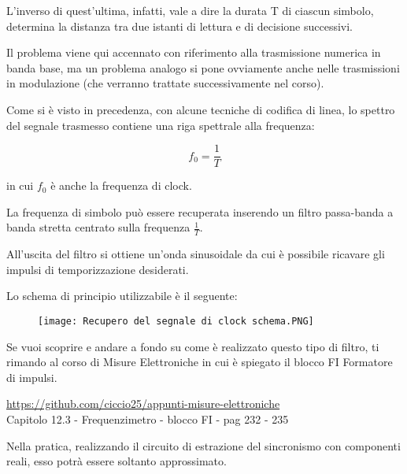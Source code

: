 L'inverso di quest'ultima, infatti, vale a dire la durata T di ciascun simbolo, 
determina la distanza tra due istanti di lettura e di decisione successivi. \newline 

Il problema viene qui accennato con riferimento alla trasmissione numerica in banda base, 
ma un problema analogo si pone ovviamente anche nelle trasmissioni in modulazione (che verranno trattate successivamente nel corso). \newline 

Come si è visto in precedenza, con alcune tecniche di codifica di linea, 
lo spettro del segnale trasmesso contiene una riga spettrale alla frequenza: 

{
    \Large
    \begin{equation}
        f_0 = \frac{1}{T}
    \end{equation}
}

in cui $f_0$ è anche la frequenza di clock. \newline 

La frequenza di simbolo può essere recuperata inserendo un filtro passa-banda a banda stretta centrato sulla frequenza $\frac{1}{T}$. \newline 

All'uscita del filtro si ottiene un'onda sinusoidale da cui è possibile ricavare gli impulsi di temporizzazione desiderati. \newline 

\newpage 

Lo schema di principio utilizzabile è il seguente: 

\begin{figure}[h]
    \centering
    \texttt{[image: Recupero del segnale di clock schema.PNG]}
\end{figure} 

\begin{tcolorbox}
    Se vuoi scoprire e andare a fondo su come è realizzato questo tipo di filtro, 
    ti rimando al corso di Misure Elettroniche in cui è spiegato il blocco FI Formatore di impulsi. \newline 

    \url{https://github.com/ciccio25/appunti-misure-elettroniche} \\
    Capitolo 12.3 - Frequenzimetro - blocco FI - pag 232 - 235 
\end{tcolorbox}

Nella pratica, realizzando il circuito di estrazione del sincronismo con componenti reali, 
esso potrà essere soltanto approssimato. \newline 

\newpage 

